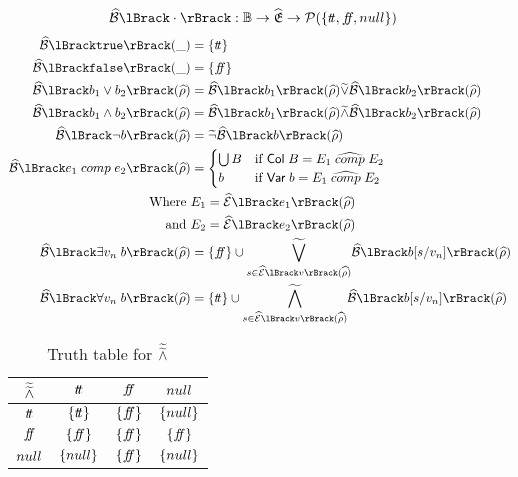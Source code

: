 \begin{align}
    \absboolsem{\cdot} &: \mathbb{B} \rightarrow \ab{\mathfrak{E}} \rightarrow \mathcal{P}(\{\true, \false, \mnull\}) \label{eq:bool-operation}
\end{align}
\begin{align}
    \absboolsem{\texttt{true}}(\_) &= \{\true\} \label{eq:abstract-bool-semantics-start} \\
    \absboolsem{\texttt{false}}(\_) &= \{\false\} \\
    \absboolsem{b_1 \lor b_2}(\ab{\environment}) &= \absboolsem{b_1}(\ab{\environment}) \aab{\lor} \absboolsem{b_2}(\ab{\environment}) \\
    \absboolsem{b_1 \land b_2}(\ab{\environment}) &= \absboolsem{b_1}(\ab{\environment}) \aab{\land} \absboolsem{b_2}(\ab{\environment}) \\
    \absboolsem{\neg b}(\ab{\environment}) &= \aab{\neg} \absboolsem{b}(\ab{\environment}) \\
    \absboolsem{e_1 \;comp\; e_2}(\ab{\environment}) &=
    \begin{cases}
        \bigcup B & \text{if } \mathsf{Col} \; B = E_1 \;\ab{\comp}\; E_2 \\
        b & \text{if } \mathsf{Var} \; b = E_1 \;\ab{\comp}\; E_2
    \end{cases}\\
    \text{Where }& E_1 = \absexpsem{e_1}(\ab{\environment}) \\
    \text{and }& E_2 = \absexpsem{e_2}(\ab{\environment}) \\
    \absboolsem{\exists v_n \; b}(\ab{\environment}) &= \{\false\} \cup \underset{s \in \absexpsem{v}(\ab{\environment})}{\aab{\bigvee}} \absboolsem{b[s/v_n]}(\ab{\environment}) \\
    \absboolsem{\forall v_n \; b}(\ab{\environment}) &= \{\true\} \cup \underset{s \in \absexpsem{v}(\ab{\environment})}{\aab{\bigwedge}} \absboolsem{b[s/v_n]}(\ab{\environment}) \label{eq:abstract-bool-semantics-end}
\end{align}


\begin{table}[H]
    \centering
    \caption{Truth table for $\widetilde{\widetilde{\land}}$}
    \begin{tabular}{c|ccc}
        $\widetilde{\widetilde{\land}}$ & $t\!t$ & $f\!\!f$ & $null$ \\
        \hline
        $t\!t$ & $\{t\!t\}$ & $\{f\!\!f\}$ & $\{null\}$ \\
        $f\!\!f$ & $\{f\!\!f\}$ & $\{f\!\!f\}$ & $\{f\!\!f\}$ \\
        $null$ & $\{null\}$ & $\{f\!\!f\}$ & $\{null\}$ \\
    \end{tabular}
    \label{tab:aaabland}
\end{table}

